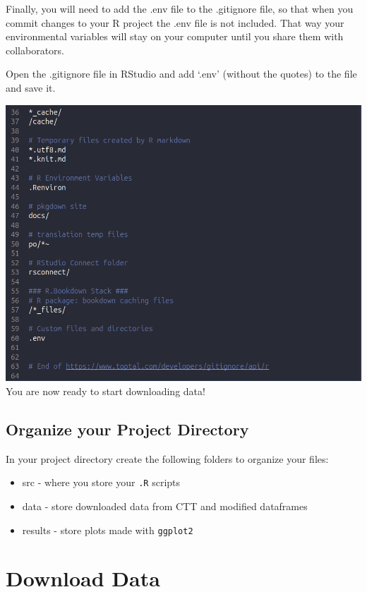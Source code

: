 \documentclass[
]{book}
\providecommand{\tightlist}{%
  \setlength{\itemsep}{0pt}\setlength{\parskip}{0pt}}
\begin{document}
Finally, you will need to add the .env file to the .gitignore file, so that when you commit changes to your R project the .env file is not included. That way your environmental variables will stay on your computer until you share them with collaborators.

Open the .gitignore file in RStudio and add `.env' (without the quotes) to the file and save it.

\includegraphics{images/git-ignore-env.png}
You are now ready to start downloading data!

\section{Organize your Project Directory}\label{organize-your-project-directory}

In your project directory create the following folders to organize your files:

\begin{itemize}
\tightlist
\item
  src - where you store your \texttt{.R} scripts
\item
  data - store downloaded data from CTT and modified dataframes
\item
  results - store plots made with \texttt{ggplot2}
\end{itemize}

\chapter{Download Data}\label{download-data}
\end{document}
